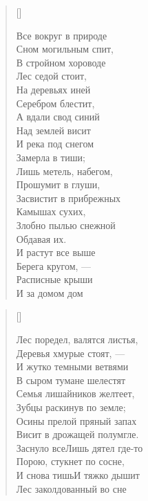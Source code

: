 \newpage
\vspace*{0cm}


\settowidth{\versewidth}{Злобно пылью снежной}
\begin{verse}[\versewidth]
\begin{patverse}
Все вокруг в природе\\
Сном могильным спит,\\
В стройном хороводе\\
Лес седой стоит,\\
На деревьях иней\\
Серебром блестит,\\
А вдали свод синий\\
Над землей висит\ldotst\\
И река под снегом\\
Замерла в тиши;\\
Лишь метель, набегом,\\
Прошумит в глуши,\\
Засвистит в прибрежных\\
Камышах сухих,\\
Злобно пылью снежной\\
Обдавая их.\\
И растут все выше\\
Берега кругом, --- \\
Расписные крыши\\
И за домом дом\ldotst
\end{patverse}
\end{verse}

\newpage
\vspace*{0cm}


\settowidth{\versewidth}{Лес поредел, валятся листья...}
\begin{verse}[\versewidth]
\begin{patverse}
Лес поредел, валятся листья,\\
Деревья хмурые стоят, ---\\
И жутко темными ветвями\\
В сыром тумане шелестят\ldotst\\
Семья лишайников желтеет,\\
Зубцы раскинув по земле;\\
Осины прелой пряный запах\\
Висит в дрожащей полумгле.\\
Заснуло все\ldotst Лишь дятел где-то\\
Порою, стукнет по сосне,\\
И снова тишь\ldotst И тяжко дышит\\
Лес заколдованный во сне\ldotst
\end{patverse}
\end{verse}

